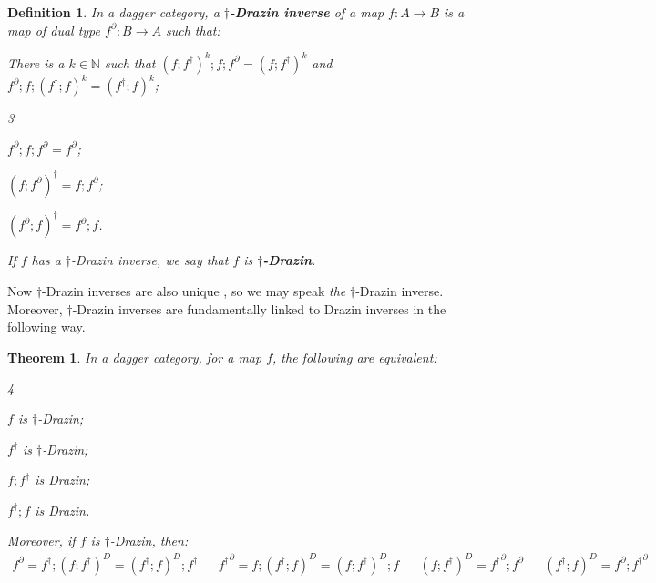 \documentclass[submission,copyright,creativecommons]{eptcs}
\newtheorem{theorem}[observation]{Theorem}
\newtheorem{definition}[observation]{Definition}
\begin{document}
\begin{definition}\label{def:dagger-Drazin}  In a dagger category, a \textbf{$\dagger$-Drazin inverse} \cite[Def 2.1]{cockett2025dagger} of a map $f: A \to B$ is a map of dual type $f^\partial: B \to A$ such that:  
\begin{enumerate}
\item There is a $k \in \mathbb{N}$ such that $(f ;f^\dagger)^k ;f; f^\partial = (f ;f^\dagger)^k$ and $f^\partial ;f ;(f^\dagger; f)^k = (f^\dagger ;f)^k$; 
\vspace{-0.3cm}
\begin{multicols}{3}
\item $f^\partial; f ;f^\partial = f^\partial$; 
\columnbreak
\item $(f;f^\partial)^\dagger = f;f^\partial$;
\columnbreak
\item $(f^\partial ;f)^\dagger = f^\partial; f$.
\end{multicols}
\end{enumerate}
\vspace{-0.3cm}
If $f$ has a $\dagger$-Drazin inverse, we say that $f$ is \textbf{$\dagger$-Drazin}. 
\end{definition}

Now $\dagger$-Drazin inverses are also unique \cite[Prop 2.2]{cockett2025dagger}, so we may speak \textit{the} $\dagger$-Drazin inverse. Moreover, $\dagger$-Drazin inverses are fundamentally linked to Drazin inverses in the following way. 

\begin{theorem}\label{thm:Drazin=dag-Drazin}\cite[Thm 3.6]{cockett2025dagger}  In a dagger category, for a map $f$, the following are equivalent: 
\begin{enumerate}[(i)]
\begin{multicols}{4}
\item $f$ is $\dagger$-Drazin;
\columnbreak
\item $f^\dagger$ is $\dagger$-Drazin;
\columnbreak
\item $f ;f^\dagger$ is Drazin; 
\columnbreak
\item $f^\dagger ;f$ is Drazin.
\end{multicols}
\end{enumerate}
Moreover, if $f$ is $\dagger$-Drazin, then:
\vspace{-0.3cm}
\begin{align*}
    f^\partial = f^\dagger ;(f ;f^\dagger)^D = (f^\dagger ;f)^D ;f^\dagger && {f^\dagger}^\partial = f ;(f^\dagger ;f)^D  =  (f ;f^\dagger)^D ;f && (f ;f^\dagger)^D = {f^\dagger}^\partial; f^\partial && (f^\dagger ;f)^D = f^\partial ;{f^\dagger}^\partial
\end{align*}
\end{theorem}
\end{document}
